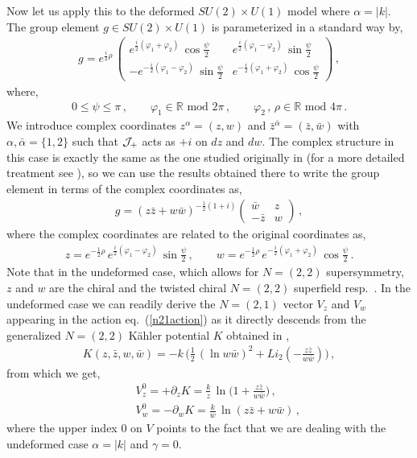 \documentclass[12pt]{article}
\def\IR{\mathbb{R}}
\begin{document}
Now let us apply this to the deformed $SU(2)\times U(1)$ model where $ \alpha = |k|$. The group element $g\in SU(2)\times U(1)$ is parameterized in a standard way by,
\begin{eqnarray}
g=e^{\frac i 2\rho }\,\left(
\begin{array}{cc} e^{\frac i 2(\varphi_1+\varphi_2)}\, \cos\frac \psi 2 & e^{\frac i 2 (\varphi_1-\varphi _2)}\,\sin \frac \psi 2 \\
-e^{-\frac i 2 (\varphi_1-\varphi _2)}\,\sin\frac \psi 2 &e^{-\frac i 2 (\varphi_1+\varphi _2)}\, \cos\frac \psi 2\end{array}\right)\,,
\end{eqnarray} 	
where,
\begin{eqnarray}
0\leq \psi\leq \pi\,,\qquad \varphi_1\in\IR\mbox{ mod } 2\pi\,,\qquad \varphi_2\,,\,\rho\in\IR\mbox{ mod } 4\pi\,.
\end{eqnarray} 
We introduce complex coordinates $z^{\alpha} = (z,w)$ and $\bar{z}^{\bar{\alpha}}=(\bar{z}, \bar{w})$ with $\alpha, \bar{\alpha}=\{1,2\}$ such that $ {\cal J}_+$ acts as $+i$ on $dz$ and $ dw$. The complex structure in this case is exactly the same as the one studied originally in \cite{Rocek:1991vk} (for a more detailed treatment see \cite{Sevrin:2011mc}), so we can use the results obtained there to write the group element in terms of the complex coordinates as,
\begin{eqnarray}
g=(z\bar z+w\bar w)^{-\frac 1 2(1+i)}\left(
\begin{array}{cc} \bar w & z \\
-\bar z &w\end{array}\right)\,,
\end{eqnarray} 
where the complex coordinates are related to the original coordinates as,
\begin{eqnarray}
z=e^{-\frac 1 2 \rho}\,e^{\frac i 2(\varphi_1-\varphi_2)}\,\sin \frac \psi 2 \,,\qquad
w=e^{-\frac 1 2 \rho}\,e^{-\frac i 2(\varphi_1+\varphi_2)}\,\cos \frac \psi 2 \,.
\end{eqnarray} 
Note that in the undeformed case, which allows for $N=(2,2)$ supersymmetry, $z$ and $w$ are the chiral and the twisted chiral $N=(2,2)$ superfield resp.\   \cite{Rocek:1991vk}. In the undeformed case we can readily derive the $N=(2,1)$ vector $V_z$ and $V_w$ appearing in the action eq.~(\ref{n21action}) as it directly descends from the generalized $N=(2,2)$ K\"ahler potential $K$ obtained in \cite{Rocek:1991vk}, 
\begin{eqnarray}
K(z,\bar z, w, \bar w)=-k\,\Big(\frac 1 2 \,(\ln w\bar w)^2+Li_2\left(-\frac{z\bar z}{w\bar w}\right)\Big)\,,
\end{eqnarray} 
from which we get,
\begin{eqnarray}
&&V^0_z = +\partial _z K=\frac{k}{z}\, \ln\Big(1 + \frac{z \bar z}{w \bar w}  \Big)\,, \nonumber\\
&&V^0_w = -\partial _w K= \frac{k}{w}\,\ln( z \bar {z } + w \bar{w} )\,,\label{vvv0}
\end{eqnarray} 
where the upper index $0$ on $V$ points to the fact that we are dealing with the undeformed case $\alpha =|k|$ and $\gamma =0$.
\end{document}
